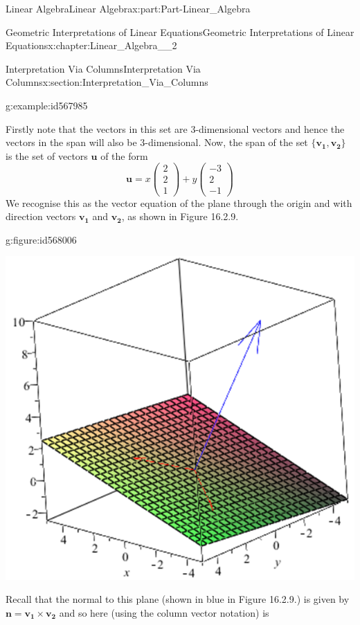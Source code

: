 \documentclass[oneside,10pt,]{book}
\numberwithin{equation}{section}
\begin{document}
\begin{partptx}{Linear Algebra}{}{Linear Algebra}{}{}{x:part:Part-Linear_Algebra}
\begin{chapterptx}{Geometric Interpretations of Linear Equations}{}{Geometric Interpretations of Linear Equations}{}{}{x:chapter:Linear_Algebra__2}
\begin{sectionptx}{Interpretation Via Columns}{}{Interpretation Via Columns}{}{}{x:section:Interpretation_Via_Columns}
\begin{example}{}{g:example:id567985}
\par\smallskip%
\noindent\hypertarget{g:solution:id567986}{}Firstly note that the vectors in this set are \(3\)-dimensional vectors and hence the vectors in the span will also be \(3\)-dimensional. Now, the span of the set \(\{\mathbf{v_1, v_2}\}\) is the set of vectors \(\mathbf{u}\) of the form%
\begin{equation*}
\mathbf{u}=x \begin{pmatrix} 2 \\ 2 \\ 1 \end{pmatrix} +y \begin{pmatrix} -3 \\ 2 \\ -1 \end{pmatrix}
\end{equation*}
We recognise this as the vector equation of the plane through the origin and with direction vectors \(\mathbf{v_1}\) and \(\mathbf{v_2}\), as shown in Figure 16.2.9. \begin{figureptx}{}{g:figure:id568006}{}%
\begin{image}{0.2}{0.6}{0.2}%
\includegraphics[width=\linewidth]{./LinearAlgebra/Images/2/figure5.png}
\end{image}%
\tcblower
\end{figureptx}%
 Recall that the normal to this plane (shown in blue in Figure 16.2.9.) is given by \(\mathbf{n=v_1\times v_2}\) and so here (using the column vector notation) is%

\end{example}
\end{sectionptx}
\end{chapterptx}
\end{partptx}
\end{document}
